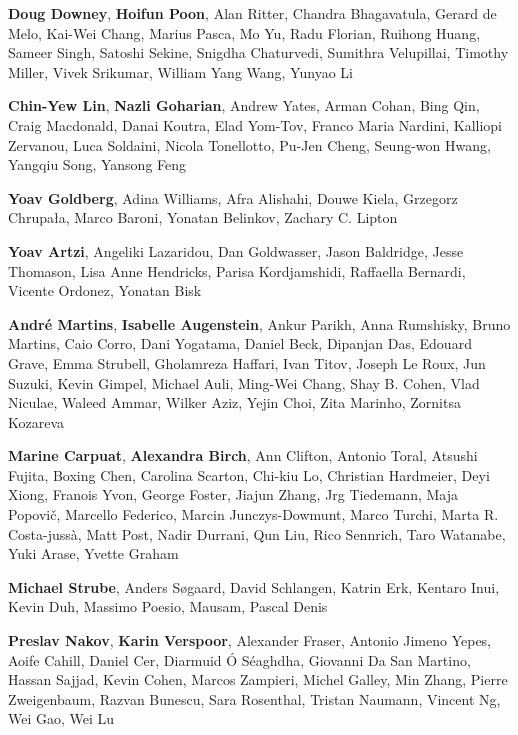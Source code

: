 \documentclass[11pt]{article}
\newcommand{\aclitem}[1][]{\item[#1:\vspace{2mm}]}
\begin{document}
\begin{description}[itemsep=4mm, style=nextline]
\begin{description}[itemsep=4mm, style=nextline]
\aclitem[Information Extraction]
\textbf{Doug Downey},
\textbf{Hoifun Poon},
Alan Ritter, Chandra Bhagavatula, Gerard de Melo, Kai-Wei Chang, Marius Pasca, Mo Yu, Radu Florian, Ruihong Huang, Sameer Singh, Satoshi Sekine, Snigdha Chaturvedi, Sumithra Velupillai, Timothy Miller, Vivek Srikumar, William Yang Wang, Yunyao Li

\aclitem[Information Retrieval and Text Mining]
\textbf{Chin-Yew Lin},
\textbf{Nazli Goharian},
Andrew Yates, Arman Cohan, Bing Qin, Craig Macdonald, Danai Koutra, Elad Yom-Tov, Franco Maria Nardini, Kalliopi Zervanou, Luca Soldaini, Nicola Tonellotto, Pu-Jen Cheng, Seung-won Hwang, Yangqiu Song, Yansong Feng

\aclitem[Interpretability and Analysis of Models for NLP]
\textbf{Yoav Goldberg},
Adina Williams, Afra Alishahi, Douwe Kiela, Grzegorz Chrupała, Marco Baroni, Yonatan Belinkov, Zachary C. Lipton

\aclitem[Language Grounding to Vision, Robotics and Beyond]
\textbf{Yoav Artzi},
Angeliki Lazaridou, Dan Goldwasser, Jason Baldridge, Jesse Thomason, Lisa Anne Hendricks, Parisa Kordjamshidi, Raffaella Bernardi, Vicente Ordonez, Yonatan Bisk

\aclitem[Machine Learning for NLP]
\textbf{Andr\'{e} Martins},
\textbf{Isabelle Augenstein},
Ankur Parikh, Anna Rumshisky, Bruno Martins, Caio Corro, Dani Yogatama, Daniel Beck, Dipanjan Das, Edouard Grave, Emma Strubell, Gholamreza Haffari, Ivan Titov, Joseph Le Roux, Jun Suzuki, Kevin Gimpel, Michael Auli, Ming-Wei Chang, Shay B. Cohen, Vlad Niculae, Waleed Ammar, Wilker Aziz, Yejin Choi, Zita Marinho, Zornitsa Kozareva

\aclitem[Machine Translation]
\textbf{Marine Carpuat},
\textbf{Alexandra Birch},
Ann Clifton, Antonio Toral, Atsushi Fujita, Boxing Chen, Carolina Scarton, Chi-kiu Lo, Christian Hardmeier, Deyi Xiong, Franois Yvon, George Foster, Jiajun Zhang, Jrg Tiedemann, Maja Popovi\v{c}, Marcello Federico, Marcin Junczys-Dowmunt, Marco Turchi, Marta R. Costa-juss\`{a}, Matt Post, Nadir Durrani, Qun Liu, Rico Sennrich, Taro Watanabe, Yuki Arase, Yvette Graham

\aclitem[Multidisciplinary and Area Chair COI]
\textbf{Michael Strube},
Anders S{\o}gaard, David Schlangen, Katrin Erk, Kentaro Inui, Kevin Duh, Massimo Poesio, Mausam, Pascal Denis

\aclitem[NLP Applications]
\textbf{Preslav Nakov},
\textbf{Karin Verspoor},
Alexander Fraser, Antonio Jimeno Yepes, Aoife Cahill, Daniel Cer, Diarmuid \'{O} S\'{e}aghdha, Giovanni Da San Martino, Hassan Sajjad, Kevin Cohen, Marcos Zampieri, Michel Galley, Min Zhang, Pierre Zweigenbaum, Razvan Bunescu, Sara Rosenthal, Tristan Naumann, Vincent Ng, Wei Gao, Wei Lu


\end{description}
\end{description}
\end{document}
